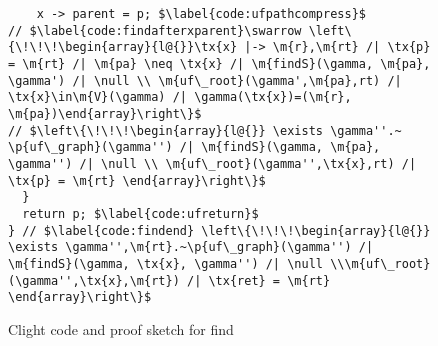 \begin{figure}[t]
\begin{lstlisting}
    x -> parent = p; $\label{code:ufpathcompress}$
// $\label{code:findafterxparent}\swarrow \left\{\!\!\!\begin{array}{l@{}}\tx{x} |-> \m{r},\m{rt} /| \tx{p} = \m{rt} /| \m{pa} \neq \tx{x} /| \m{findS}(\gamma, \m{pa}, \gamma') /| \null \\ \m{uf\_root}(\gamma',\m{pa},rt) /| \tx{x}\in\m{V}(\gamma) /| \gamma(\tx{x})=(\m{r}, \m{pa})\end{array}\right\}$
// $\left\{\!\!\!\begin{array}{l@{}} \exists \gamma''.~ \p{uf\_graph}(\gamma'') /| \m{findS}(\gamma, \m{pa}, \gamma'') /| \null \\ \m{uf\_root}(\gamma'',\tx{x},rt) /| \tx{p} = \m{rt} \end{array}\right\}$
  }
  return p; $\label{code:ufreturn}$
} // $\label{code:findend} \left\{\!\!\!\begin{array}{l@{}} \exists \gamma'',\m{rt}.~\p{uf\_graph}(\gamma'') /| \m{findS}(\gamma, \tx{x}, \gamma'') /| \null \\\m{uf\_root}(\gamma'',\tx{x},\m{rt}) /| \tx{ret} = \m{rt}  \end{array}\right\}$
\end{lstlisting}







\vspace{-0.4em}
\caption{Clight code and proof sketch for find}
\label{fig:find}
\vspace{-1em}
\end{figure} 
